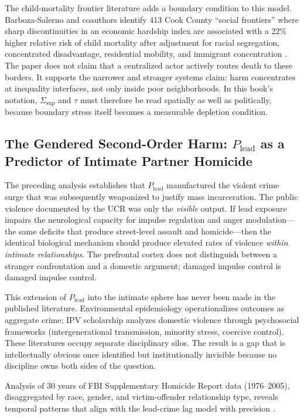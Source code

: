 The child-mortality frontier literature adds a boundary condition to this model. Barboza-Salerno and coauthors identify 413 Cook County ``social frontiers'' where sharp discontinuities in an economic hardship index are associated with a 22\% higher relative risk of child mortality after adjustment for racial segregation, concentrated disadvantage, residential mobility, and immigrant concentration \cite{barboza_salerno_child_frontiers_2025}. The paper does not claim that a centralized actor actively routes death to these borders. It supports the narrower and stronger systems claim: harm concentrates at inequality interfaces, not only inside poor neighborhoods. In this book's notation, $\Sigma_{\text{sup}}$ and $\tau$ must therefore be read spatially as well as politically, because boundary stress itself becomes a measurable depletion condition.

\subsection{The Gendered Second-Order Harm: \texorpdfstring{$P_{\text{lead}}$}{P\_lead} as a Predictor of Intimate Partner Homicide}

The preceding analysis establishes that $P_{\text{lead}}$ manufactured the violent crime surge that was subsequently weaponized to justify mass incarceration. The public violence documented by the UCR was only the \textit{visible} output. If lead exposure impairs the neurological capacity for impulse regulation and anger modulation---the same deficits that produce street-level assault and homicide---then the identical biological mechanism should produce elevated rates of violence \textit{within intimate relationships}. The prefrontal cortex does not distinguish between a stranger confrontation and a domestic argument; damaged impulse control is damaged impulse control.

This extension of $P_{\text{lead}}$ into the intimate sphere has never been made in the published literature. Environmental epidemiology operationalizes outcomes as aggregate crime; IPV scholarship analyzes domestic violence through psychosocial frameworks (intergenerational transmission, minority stress, coercive control). These literatures occupy separate disciplinary silos. The result is a gap that is intellectually obvious once identified but institutionally invisible because no discipline owns both sides of the question.

Analysis of 30 years of FBI Supplementary Homicide Report data (1976--2005), disaggregated by race, gender, and victim-offender relationship type, reveals temporal patterns that align with the lead-crime lag model with precision \cite{fox_zawitz2007, paulozzi_iph, puzone_iph}.

